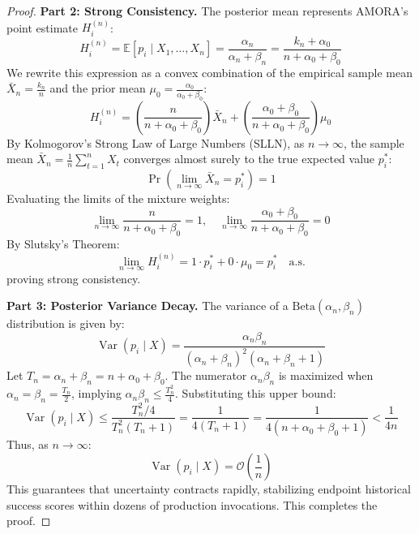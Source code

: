 \begin{proof}
\textbf{Part 2: Strong Consistency.}
The posterior mean represents AMORA's point estimate $H_i^{(n)}$:
\begin{equation}
    H_i^{(n)} = \mathbb{E}[p_i \mid X_1, \dots, X_n] = \frac{\alpha_n}{\alpha_n + \beta_n} = \frac{k_n + \alpha_0}{n + \alpha_0 + \beta_0}
\end{equation}
We rewrite this expression as a convex combination of the empirical sample mean $\bar{X}_n = \frac{k_n}{n}$ and the prior mean $\mu_0 = \frac{\alpha_0}{\alpha_0 + \beta_0}$:
\begin{equation}
    H_i^{(n)} = \left( \frac{n}{n + \alpha_0 + \beta_0} \right) \bar{X}_n + \left( \frac{\alpha_0 + \beta_0}{n + \alpha_0 + \beta_0} \right) \mu_0
\end{equation}
By Kolmogorov's Strong Law of Large Numbers (SLLN), as $n \to \infty$, the sample mean $\bar{X}_n = \frac{1}{n} \sum_{t=1}^n X_t$ converges almost surely to the true expected value $p_i^*$:
\begin{equation}
    \Pr\left( \lim_{n \to \infty} \bar{X}_n = p_i^* \right) = 1
\end{equation}
Evaluating the limits of the mixture weights:
\begin{equation}
    \lim_{n \to \infty} \frac{n}{n + \alpha_0 + \beta_0} = 1, \quad \lim_{n \to \infty} \frac{\alpha_0 + \beta_0}{n + \alpha_0 + \beta_0} = 0
\end{equation}
By Slutsky's Theorem:
\begin{equation}
    \lim_{n \to \infty} H_i^{(n)} = 1 \cdot p_i^* + 0 \cdot \mu_0 = p_i^* \quad \text{a.s.}
\end{equation}
proving strong consistency.

\textbf{Part 3: Posterior Variance Decay.}
The variance of a $\text{Beta}(\alpha_n, \beta_n)$ distribution is given by:
\begin{equation}
    \operatorname{Var}(p_i \mid X) = \frac{\alpha_n \beta_n}{(\alpha_n + \beta_n)^2 (\alpha_n + \beta_n + 1)}
\end{equation}
Let $T_n = \alpha_n + \beta_n = n + \alpha_0 + \beta_0$. The numerator $\alpha_n \beta_n$ is maximized when $\alpha_n = \beta_n = \frac{T_n}{2}$, implying $\alpha_n \beta_n \le \frac{T_n^2}{4}$. Substituting this upper bound:
\begin{equation}
    \operatorname{Var}(p_i \mid X) \le \frac{T_n^2 / 4}{T_n^2 (T_n + 1)} = \frac{1}{4 (T_n + 1)} = \frac{1}{4(n + \alpha_0 + \beta_0 + 1)} < \frac{1}{4n}
\end{equation}
Thus, as $n \to \infty$:
\begin{equation}
    \operatorname{Var}(p_i \mid X) = \mathcal{O}\left( \frac{1}{n} \right)
\end{equation}
This guarantees that uncertainty contracts rapidly, stabilizing endpoint historical success scores within dozens of production invocations. This completes the proof.
\end{proof}
